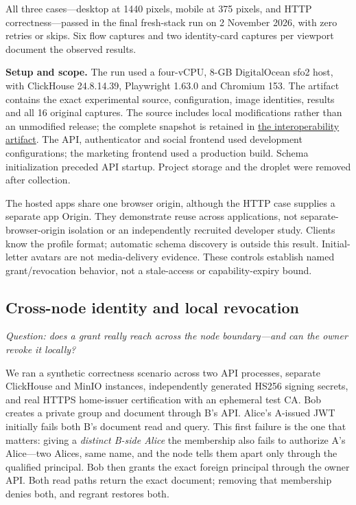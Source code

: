 \documentclass[sigconf, nonacm]{acmart}
\newcommand{\artifactbase}{https://github.com/jacoby149/web10}
\newcommand{\domainartifactrev}{26720acba859c7eb03fc5d26a6221cdde5b764a1}
\newcommand{\domainartifactdir}[2]{\href{\artifactbase/tree/\domainartifactrev/#1}{#2}}
\begin{document}
All three cases---desktop at 1440 pixels, mobile at 375 pixels, and HTTP
correctness---passed in the final fresh-stack run on 2 November 2026, with
zero retries or skips. Six flow captures and two identity-card captures per
viewport document the observed results.

\textbf{Setup and scope.} The run used a four-vCPU, 8-GB DigitalOcean sfo2
host, with ClickHouse 24.8.14.39, Playwright 1.63.0 and Chromium 153. The
artifact contains the exact experimental source, configuration, image
identities, results and all 16 original captures. The source includes local
modifications rather than an unmodified release; the complete snapshot is
retained in \domainartifactdir{research/interoperability-demo}{the
interoperability artifact}. The API, authenticator and social frontend used
development configurations; the marketing frontend used a production build.
Schema initialization preceded API startup. Project storage and the droplet
were removed after collection.

The hosted apps share one browser origin, although the HTTP case supplies a
separate app Origin. They demonstrate reuse across applications, not
separate-browser-origin isolation or an independently recruited developer
study. Clients know the profile format; automatic schema discovery is outside
this result. Initial-letter avatars are not media-delivery evidence. These
controls establish named grant/revocation behavior, not a stale-access or
capability-expiry bound.

\subsection{Cross-node identity and local revocation}
\label{sec:federation-results}

\emph{Question: does a grant really reach across the node boundary---and can
the owner revoke it locally?}

We ran a synthetic correctness scenario across two API processes, separate
ClickHouse and MinIO instances, independently generated HS256 signing
secrets, and real HTTPS home-issuer certification with an ephemeral test CA.
Bob creates a private group and document through B's API. Alice's
A-issued JWT initially fails both B's document read and query. This first
failure is the one that matters: giving a \emph{distinct B-side Alice} the
membership also fails to authorize A's Alice---two Alices, same name, and the
node tells them apart only through the qualified principal. Bob then grants
the exact foreign principal through the owner API. Both read paths return the
exact document; removing that membership denies both, and regrant restores
both.
\end{document}
